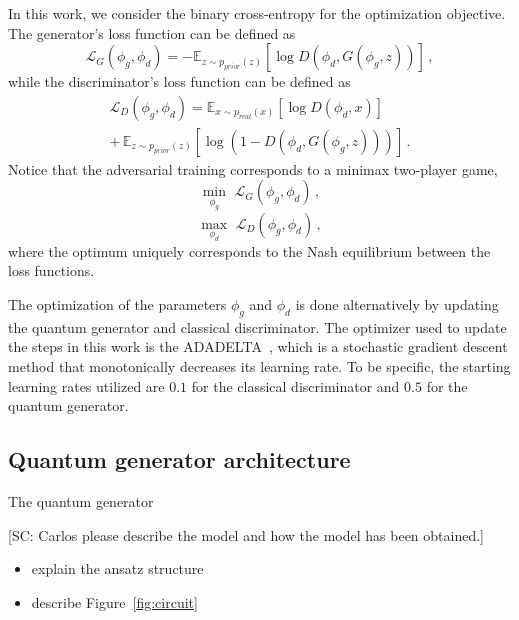 \documentclass[twocolumn,preprintnumbers,superscriptaddress]{revtex4-2}
\begin{document}
In this work, we consider the binary cross-entropy for the optimization objective. The generator's loss function can be defined as
\begin{equation}
  \mathcal{L}_G(\phi_g,\phi_d) = -\mathbb{E}_{z \sim p_{prior}(z)}[\log D(\phi_d,G(\phi_g,z))]  \,,
\end{equation}
while the discriminator's loss function can be defined as
\begin{equation}
\begin{split}
  \mathcal{L}_D(\phi_g,\phi_d) = \mathbb{E}_{x \sim p_{real}(x)}[\log D(\phi_d,x)] \\+\, \mathbb{E}_{z \sim p_{prior}(z)}[\log (1-D(\phi_d,G(\phi_g,z)))]\,.
\end{split}
\end{equation}
Notice that the adversarial training corresponds to a minimax two-player game, 
\begin{equation}
 \underset{\phi_g}{\min}\,\,\mathcal{L}_G(\phi_g,\phi_d)  \,,
\end{equation}
\begin{equation}
 \underset{\phi_d}{\max}\,\,\mathcal{L}_D(\phi_g,\phi_d)  \,,
\end{equation}
where the optimum uniquely corresponds to the Nash equilibrium between the loss functions.

The optimization of the parameters $\phi_g$ and $\phi_d$ is done alternatively by updating the quantum generator and classical discriminator. The optimizer used to update the steps in this work is the ADADELTA~\cite{zeiler2012adadelta}, which is a stochastic gradient descent method that monotonically decreases its learning rate. To be specific, the starting learning rates utilized are $0.1$ for the classical discriminator and $0.5$ for the quantum generator.

\subsection{Quantum generator architecture}
The quantum generator


{\color{red}[SC: Carlos please describe the model and how the model has been
    obtained.]}

\begin{itemize}
  \item explain the ansatz structure
  \item describe Figure~\ref{fig:circuit}
\end{itemize}
\end{document}
